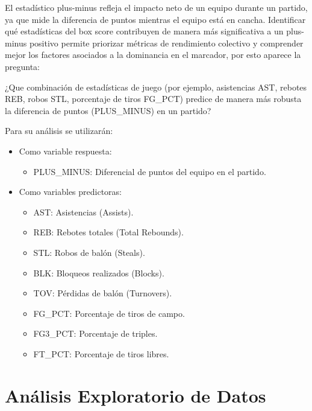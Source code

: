 \documentclass[12pt]{article}
\begin{document}
\vspace{0.3cm}

El estadístico plus-minus refleja el impacto neto de un equipo durante un partido, ya que mide la diferencia de puntos mientras el equipo está en cancha. Identificar qué estadísticas del box score contribuyen de manera más significativa a un plus-minus positivo permite priorizar métricas de rendimiento colectivo y comprender mejor los factores asociados a la dominancia en el marcador, por esto aparece la pregunta:

\vspace{0.3cm}

¿Que combinación de estadísticas de juego (por ejemplo, asistencias AST, rebotes REB, robos STL, porcentaje de tiros FG\_PCT) predice de manera más robusta la diferencia de puntos (PLUS\_MINUS) en un partido?

\vspace{0.3cm}

Para su análisis se utilizarán:
\begin{itemize}[label={}]
    \setlength\itemsep{0.1em}
    \item Como variable respuesta:
    \begin{itemize}[label={}]
        \item PLUS\_MINUS: Diferencial de puntos del equipo en el partido.
    \end{itemize}
    \item Como variables predictoras:
    \begin{itemize}[label={}]
        \item AST: Asistencias (Assists).
        \item REB: Rebotes totales (Total Rebounds).
        \item STL: Robos de balón (Steals).
        \item BLK: Bloqueos realizados (Blocks).
        \item TOV: Pérdidas de balón (Turnovers).
        \item FG\_PCT: Porcentaje de tiros de campo.
        \item FG3\_PCT: Porcentaje de triples.
        \item FT\_PCT: Porcentaje de tiros libres.
    \end{itemize}
\end{itemize}

\section*{Análisis Exploratorio de Datos}
\end{document}
